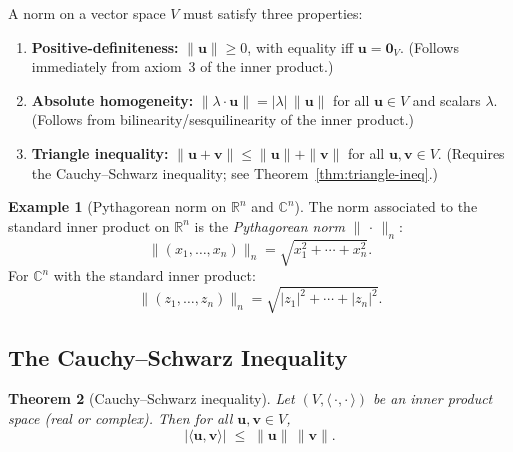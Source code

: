 \documentclass[11pt, a4paper, notitlepage]{report}
\newtheorem{theorem}{Theorem}[section]
\theoremstyle{definition}
\newtheorem{example}[theorem]{Example}
\theoremstyle{remark}
\begin{document}
A norm on a vector space $V$ must satisfy three properties:
\begin{enumerate}
  \item \textbf{Positive-definiteness:} $\|\mathbf{u}\| \geq 0$, with equality iff $\mathbf{u} = \mathbf{0}_V$.
        (Follows immediately from axiom~3 of the inner product.)
  \item \textbf{Absolute homogeneity:} $\|\lambda\cdot\mathbf{u}\| = |\lambda|\,\|\mathbf{u}\|$
        for all $\mathbf{u}\in V$ and scalars $\lambda$.
        (Follows from bilinearity/sesquilinearity of the inner product.)
  \item \textbf{Triangle inequality:} $\|\mathbf{u}+\mathbf{v}\| \leq \|\mathbf{u}\|+\|\mathbf{v}\|$
        for all $\mathbf{u},\mathbf{v}\in V$. (Requires the Cauchy--Schwarz inequality; see
        Theorem~\ref{thm:triangle-ineq}.)
\end{enumerate}

\begin{example}[Pythagorean norm on $\mathbb{R}^n$ and $\mathbb{C}^n$]
\label{ex:pythagorean-norm}
The norm associated to the standard inner product on $\mathbb{R}^n$ is the
\emph{Pythagorean norm} $\|\,\cdot\,\|_n$:
\[
  \|(x_1,\ldots,x_n)\|_n = \sqrt{x_1^2 + \cdots + x_n^2}.
\]
For $\mathbb{C}^n$ with the standard inner product:
\[
  \|(z_1,\ldots,z_n)\|_n = \sqrt{|z_1|^2 + \cdots + |z_n|^2}.
\]
\end{example}

\subsection{The Cauchy--Schwarz Inequality}
\label{subsec:cauchy-schwarz}

\begin{theorem}[Cauchy--Schwarz inequality]
\label{thm:cauchy-schwarz}
Let $(V,\langle\,\cdot,\cdot\,\rangle)$ be an inner product space (real or complex).
Then for all $\mathbf{u},\mathbf{v}\in V$,
\[
  |\langle\mathbf{u},\mathbf{v}\rangle| \;\leq\; \|\mathbf{u}\|\,\|\mathbf{v}\|.
\]
\end{theorem}
\end{document}
